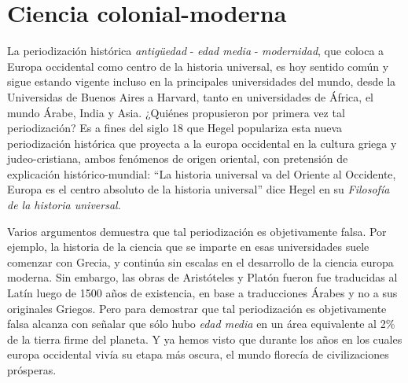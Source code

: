 \documentclass[a4paper,10pt]{book}
\theoremstyle{definition}
\begin{document}
\section{Ciencia colonial-moderna}

La periodización histórica \emph{antigüedad} - \emph{edad media} - \emph{modernidad}, que coloca a Europa occidental como centro de la historia universal, es hoy sentido común y sigue estando vigente incluso en la principales universidades del mundo, desde la Universidas de Buenos Aires a Harvard, tanto en universidades de África, el mundo Árabe, India y Asia.
¿Qui\'enes propusieron por primera vez tal periodizaci\'on?
Es a fines del siglo 18 que Hegel populariza esta nueva periodizaci\'on hist\'orica que proyecta a la europa occidental en la cultura griega y judeo-cristiana, ambos fenómenos de origen oriental, con pretensión de explicación histórico-mundial: ``La historia universal va del Oriente al Occidente, Europa es el centro absoluto de la historia universal'' dice Hegel en su \emph{Filosofía de la historia universal}.


Varios argumentos demuestra que tal periodizaci\'on es objetivamente falsa.
Por ejemplo, la historia de la ciencia que se imparte en esas universidades suele comenzar con Grecia, y continúa sin escalas en el desarrollo de la ciencia europa moderna.
Sin embargo, las obras de Aristóteles y Platón fueron fue traducidas al Latín luego de 1500 años de existencia, en base a traducciones Árabes y no a sus originales Griegos.
Pero para demostrar que tal periodizaci\'on es objetivamente falsa alcanza con señalar que sólo hubo \emph{edad media} en un área equivalente al 2\% de la tierra firme del planeta.
Y ya hemos visto que durante los años en los cuales europa occidental vivía su etapa más oscura, el mundo florecía de civilizaciones prósperas.

\end{document}
